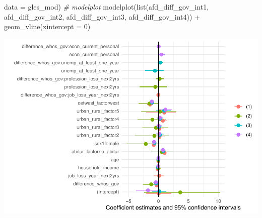 \documentclass[
]{article}
\newenvironment{Shaded}{\begin{snugshade}}{\end{snugshade}}
\newcommand{\AttributeTok}[1]{\textcolor[rgb]{0.77,0.63,0.00}{#1}}
\newcommand{\CommentTok}[1]{\textcolor[rgb]{0.56,0.35,0.01}{\textit{#1}}}
\newcommand{\DecValTok}[1]{\textcolor[rgb]{0.00,0.00,0.81}{#1}}
\newcommand{\FunctionTok}[1]{\textcolor[rgb]{0.00,0.00,0.00}{#1}}
\newcommand{\NormalTok}[1]{#1}
\newcommand{\SpecialCharTok}[1]{\textcolor[rgb]{0.00,0.00,0.00}{#1}}
\begin{document}
\begin{Shaded}
\begin{Highlighting}[]
                         \AttributeTok{data =}\NormalTok{ gles\_mod)}
\CommentTok{\# modelplot }
\FunctionTok{modelplot}\NormalTok{(}\FunctionTok{list}\NormalTok{(afd\_diff\_gov\_int1, afd\_diff\_gov\_int2, }
\NormalTok{               afd\_diff\_gov\_int3, afd\_diff\_gov\_int4)) }\SpecialCharTok{+}
  \FunctionTok{geom\_vline}\NormalTok{(}\AttributeTok{xintercept =} \DecValTok{0}\NormalTok{)}
\end{Highlighting}
\end{Shaded}

\includegraphics{AVCD_Final_Assignment-Edenhofer_latest_files/figure-latex/interaction-models-lack-rep-1.pdf}
\end{document}
